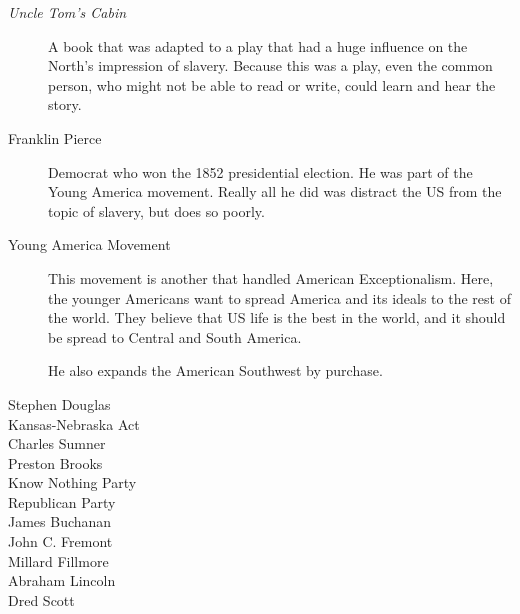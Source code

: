 \begin{description}
\item[\textit{Uncle Tom’s Cabin}] A book that was adapted to a play that had a huge influence on the North's impression of slavery.
  Because this was a play, even the common person, who might not be able to read or write, could learn and hear the story.

\item[Franklin Pierce] Democrat who won the 1852 presidential election.
  He was part of the Young America movement.
  Really all he did was distract the US from the topic of slavery, but does so poorly.

\item[Young America Movement] This movement is another that handled American Exceptionalism.
  Here, the younger Americans want to spread America and its ideals to the rest of the world.
  They believe that US life is the best in the world, and it should be spread to Central and South America.

  He also expands the American Southwest by purchase.

\item[Stephen Douglas]
\item[Kansas-Nebraska Act]
\item[Charles Sumner]
\item[Preston Brooks]
\item[Know Nothing Party]
\item[Republican Party]
\item[James Buchanan]
\item[John C. Fremont]
\item[Millard Fillmore]
\item[Abraham Lincoln]
\item[Dred Scott]
\end{description}

\clearpage
\printbibliography{}


